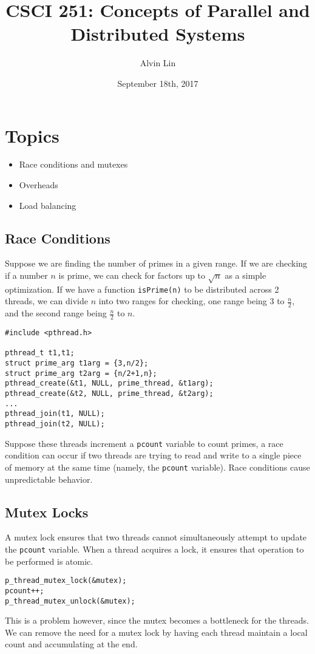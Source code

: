 \documentclass[letterpaper, 12pt]{math}
\title{CSCI 251: Concepts of Parallel and Distributed Systems}
\author{Alvin Lin}
\date{September 18th, 2017}
\begin{document}
\maketitle

\section*{Topics}
\begin{itemize}
  \item Race conditions and mutexes
  \item Overheads
  \item Load balancing
\end{itemize}

\subsection*{Race Conditions}
Suppose we are finding the number of primes in a given range. If we are
checking if a number \( n \) is prime, we can check for factors up to
\( \sqrt{n} \) as a simple optimization. If we have a function
\texttt{isPrime(n)} to be distributed across 2 threads, we can divide \( n \)
into two ranges for checking, one range being 3 to \( \frac{n}{2} \), and the
second range being \( \frac{n}{2} \) to \( n \).
\begin{lstlisting}
#include <pthread.h>

pthread_t t1,t1;
struct prime_arg t1arg = {3,n/2};
struct prime_arg t2arg = {n/2+1,n};
pthread_create(&t1, NULL, prime_thread, &t1arg);
pthread_create(&t2, NULL, prime_thread, &t2arg);
...
pthread_join(t1, NULL);
pthread_join(t2, NULL);
\end{lstlisting}
Suppose these threads increment a \texttt{pcount} variable to count primes,
a race condition can occur if two threads are trying to read and write to a
single piece of memory at the same time (namely, the \texttt{pcount} variable).
Race conditions cause unpredictable behavior.

\subsection*{Mutex Locks}
A mutex lock ensures that two threads cannot simultaneously attempt to update
the \texttt{pcount} variable. When a thread acquires a lock, it ensures that
operation to be performed is atomic.
\begin{lstlisting}
p_thread_mutex_lock(&mutex);
pcount++;
p_thread_mutex_unlock(&mutex);
\end{lstlisting}
This is a problem however, since the mutex becomes a bottleneck for the threads.
We can remove the need for a mutex lock by having each thread maintain a local
count and accumulating at the end.
\end{document}
